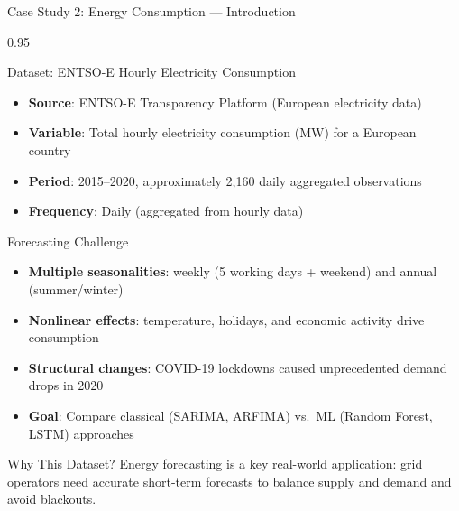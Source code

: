 \documentclass[9pt, aspectratio=169, t]{beamer}
\begin{document}
\begin{frame}{Case Study 2: Energy Consumption --- Introduction}
    \begin{cminipage}{0.95\textwidth}
    \vspace{-2mm}
    \begin{block}{Dataset: ENTSO-E Hourly Electricity Consumption}
        {\small
        \begin{itemize}\setlength{\itemsep}{1pt}
            \item \textbf{Source}: ENTSO-E Transparency Platform (European electricity data)
            \item \textbf{Variable}: Total hourly electricity consumption (MW) for a European country
            \item \textbf{Period}: 2015--2020, approximately 2{,}160 daily aggregated observations
            \item \textbf{Frequency}: Daily (aggregated from hourly data)
        \end{itemize}
        }
    \end{block}
    \vspace{-2mm}
    \begin{alertblock}{Forecasting Challenge}
        {\small
        \begin{itemize}\setlength{\itemsep}{1pt}
            \item \textbf{Multiple seasonalities}: weekly (5 working days + weekend) and annual (summer/winter)
            \item \textbf{Nonlinear effects}: temperature, holidays, and economic activity drive consumption
            \item \textbf{Structural changes}: COVID-19 lockdowns caused unprecedented demand drops in 2020
            \item \textbf{Goal}: Compare classical (SARIMA, ARFIMA) vs.\ ML (Random Forest, LSTM) approaches
        \end{itemize}
        }
    \end{alertblock}
    \vspace{-2mm}
    \begin{exampleblock}{Why This Dataset?}
        {\small Energy forecasting is a key real-world application: grid operators need accurate short-term forecasts to balance supply and demand and avoid blackouts.}
    \end{exampleblock}
    \end{cminipage}
\end{frame}
\end{document}
